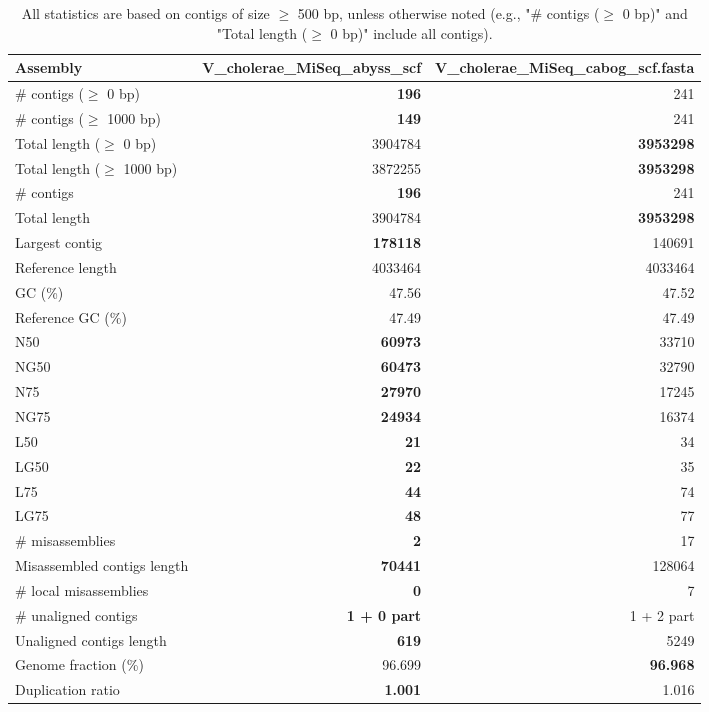 \documentclass[12pt,a4paper]{article}
\begin{document}
\begin{table}[ht]
\begin{center}
\caption{All statistics are based on contigs of size $\geq$ 500 bp, unless otherwise noted (e.g., "\# contigs ($\geq$ 0 bp)" and "Total length ($\geq$ 0 bp)" include all contigs).}
\begin{tabular}{|l*{2}{|r}|}
\hline
Assembly & V\_cholerae\_MiSeq\_abyss\_scf & V\_cholerae\_MiSeq\_cabog\_scf.fasta \\ \hline
\# contigs ($\geq$ 0 bp) & {\bf 196} & 241 \\ \hline
\# contigs ($\geq$ 1000 bp) & {\bf 149} & 241 \\ \hline
Total length ($\geq$ 0 bp) & 3904784 & {\bf 3953298} \\ \hline
Total length ($\geq$ 1000 bp) & 3872255 & {\bf 3953298} \\ \hline
\# contigs & {\bf 196} & 241 \\ \hline
Total length & 3904784 & {\bf 3953298} \\ \hline
Largest contig & {\bf 178118} & 140691 \\ \hline
Reference length & 4033464 & 4033464 \\ \hline
GC (\%) & 47.56 & 47.52 \\ \hline
Reference GC (\%) & 47.49 & 47.49 \\ \hline
N50 & {\bf 60973} & 33710 \\ \hline
NG50 & {\bf 60473} & 32790 \\ \hline
N75 & {\bf 27970} & 17245 \\ \hline
NG75 & {\bf 24934} & 16374 \\ \hline
L50 & {\bf 21} & 34 \\ \hline
LG50 & {\bf 22} & 35 \\ \hline
L75 & {\bf 44} & 74 \\ \hline
LG75 & {\bf 48} & 77 \\ \hline
\# misassemblies & {\bf 2} & 17 \\ \hline
Misassembled contigs length & {\bf 70441} & 128064 \\ \hline
\# local misassemblies & {\bf 0} & 7 \\ \hline
\# unaligned contigs & {\bf 1 + 0 part} & 1 + 2 part \\ \hline
Unaligned contigs length & {\bf 619} & 5249 \\ \hline
Genome fraction (\%) & 96.699 & {\bf 96.968} \\ \hline
Duplication ratio & {\bf 1.001} & 1.016 \\ \hline

\end{tabular}
\end{center}
\end{table}
\end{document}
